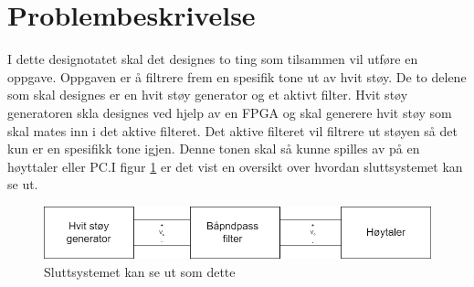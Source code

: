 \clearpage
\section{Problembeskrivelse}
\label{problemBeskrivelse}


I dette designotatet skal det designes to ting som tilsammen vil utføre en oppgave. Oppgaven er å filtrere frem en spesifik tone ut av hvit støy. De to delene som skal designes er en hvit støy generator og et aktivt filter. Hvit støy generatoren skla designes ved hjelp av en FPGA og skal generere hvit støy som skal mates inn i det aktive filteret. Det aktive filteret vil filtrere ut støyen så det kun er en spesifikk tone igjen. Denne tonen skal så kunne spilles av på en høyttaler eller PC.I figur \ref{overview} er det vist en oversikt over hvordan sluttsystemet kan se ut.

\begin{figure}[!h]
\centering
\includegraphics[width=1\linewidth]{Bilder/overblikk.drawio.png}
\caption{Sluttsystemet kan se ut som dette}
\label{overview}
\end{figure}